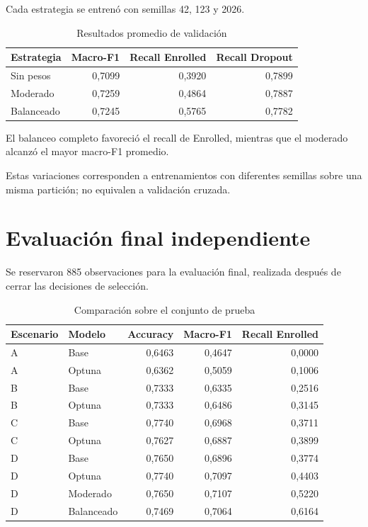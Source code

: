 \documentclass[11pt,a4paper]{article}
\begin{document}
Cada estrategia se entrenó con semillas
42, 123 y 2026.

\begin{table}[H]
\centering
\caption{Resultados promedio de validación}
\small
\begin{tabular}{lrrr}
\toprule
Estrategia & Macro-F1 & Recall Enrolled & Recall Dropout \\
\midrule
Sin pesos & 0,7099 & 0,3920 & 0,7899 \\
Moderado & 0,7259 & 0,4864 & 0,7887 \\
Balanceado & 0,7245 & 0,5765 & 0,7782 \\
\bottomrule
\end{tabular}
\end{table}

El balanceo completo favoreció el recall de
Enrolled, mientras que el moderado alcanzó
el mayor macro-F1 promedio.

Estas variaciones corresponden a entrenamientos
con diferentes semillas sobre una misma partición;
no equivalen a validación cruzada.

\section{Evaluación final independiente}

Se reservaron 885 observaciones para la
evaluación final, realizada después de cerrar
las decisiones de selección.

\begin{table}[H]
\centering
\caption{Comparación sobre el conjunto de prueba}
\small
\begin{tabular}{llrrr}
\toprule
Escenario & Modelo & Accuracy & Macro-F1 & Recall Enrolled \\
\midrule
A & Base & 0,6463 & 0,4647 & 0,0000 \\
A & Optuna & 0,6362 & 0,5059 & 0,1006 \\
B & Base & 0,7333 & 0,6335 & 0,2516 \\
B & Optuna & 0,7333 & 0,6486 & 0,3145 \\
C & Base & 0,7740 & 0,6968 & 0,3711 \\
C & Optuna & 0,7627 & 0,6887 & 0,3899 \\
D & Base & 0,7650 & 0,6896 & 0,3774 \\
D & Optuna & 0,7740 & 0,7097 & 0,4403 \\
D & Moderado & 0,7650 & 0,7107 & 0,5220 \\
D & Balanceado & 0,7469 & 0,7064 & 0,6164 \\
\bottomrule
\end{tabular}
\end{table}
\end{document}
